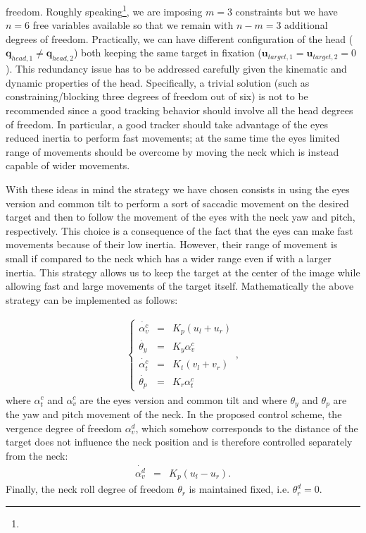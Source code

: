 freedom. Roughly speaking\footnote{}, we are imposing 
$m=3$ constraints but we have $n=6$ free variables available so that we 
remain with $n-m=3$ additional degrees of freedom. Practically, we can have 
different configuration of the head ($\mathbf q_{head,1} \neq \mathbf 
q_{head,2}$) both keeping the same target in fixation 
(${\mathbf u}_{target,1} = {\mathbf u}_{target,2} = 0$). This 
redundancy issue has to be addressed carefully given the kinematic and 
dynamic properties of the head. Specifically, a trivial solution (such 
as constraining/blocking three degrees of freedom out of six) is not to be 
recommended since a good tracking behavior should involve all the  head 
degrees of freedom. In particular, a good tracker should take advantage of 
the eyes reduced inertia to perform fast movements; at the same time the 
eyes limited range of movements should be overcome by moving the neck which 
is instead capable of wider movements.

With these ideas in mind the strategy we have chosen consists in using the 
eyes version and common tilt to perform a sort of saccadic movement on the 
desired target and then to follow the movement of the eyes with the neck 
yaw and pitch, respectively. This choice is a consequence of the fact that 
the eyes can make fast movements because of their low inertia. However, 
their range of movement is small if compared to the neck which has a wider 
range even if with a larger inertia. This strategy allows us to keep the 
target at the center of the image while allowing fast and large movements 
of the target itself. Mathematically the above strategy can be implemented 
as follows:

\begin{eqnarray} \label{Eq:HeadEyeControl}
\left\{ \begin{matrix}
\dot {\alpha_v^c} &=&   K_p (u_l + u_r)\\
\dot {\theta_y} &=&   K_y \alpha_v^c \\
\dot {\alpha_t^c} &=&   K_t (v_l + v_r)\\
\dot {\theta_p} &=&   K_r \alpha_t^c
\end{matrix} \right.,
\end{eqnarray}
where $\alpha_t^c$ and $\alpha_v^c$ are the eyes version and common tilt and 
where $\theta_y$ and $\theta_p$ are the yaw and pitch movement of the neck. 
In the proposed control scheme, the vergence degree of freedom $\alpha_v^d$, 
which somehow corresponds to the distance of the target does not influence 
the neck position and is therefore controlled separately from the neck:
\begin{eqnarray} 
\dot {\alpha_v^d} &=&   K_p (u_l - u_r).
\end{eqnarray}
Finally, the neck roll degree of freedom $\theta_r$ is maintained fixed, 
i.e. $\theta_r^d=0$.

